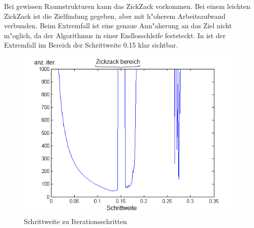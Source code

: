 Bei gewissen Raumstrukturen kann das ZickZack vorkommen. Bei einem
leichten ZickZack ist die Zielfindung gegeben, aber mit h"oherem
Arbeitsaufwand verbunden.
Beim Extremfall ist eine genaue Ann"aherung an das Ziel nicht m"oglich,
da der Algorithmus in einer Endlosschleife feststeckt.
In  ist der Extremfall im Bereich der Schrittweite 0.15
klar sichtbar.

\begin{figure}
\centering
\includegraphics[height=0.5\textwidth]{descent/zzstep.png}
\caption{Schrittweite zu Iterationsschritten}\label{s_vs_i}
\end{figure}


